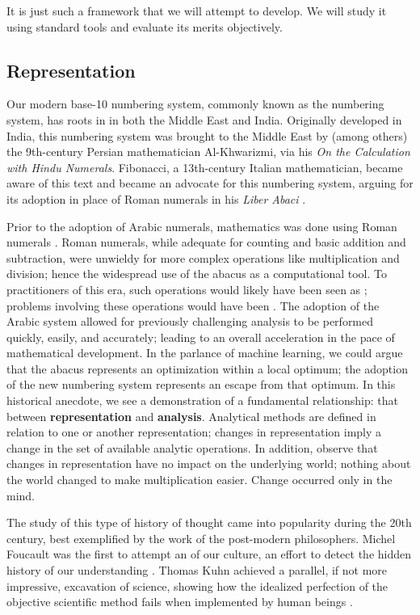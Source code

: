 It is just such a framework that we will attempt to develop.
We will study it using standard tools and evaluate its merits objectively.


\subsection{Representation}

Our modern base-10 numbering system, commonly known as the  numbering system, has roots in in both the Middle East and India.
Originally developed in India, this numbering system was brought to the Middle East by (among others) the 9th-century Persian mathematician Al-Khwarizmi, via his \textit{On the Calculation with Hindu Numerals}.
Fibonacci, a 13th-century Italian mathematician, became aware of this text and became an advocate for this numbering system, arguing for its adoption in place of Roman numerals in his \textit{Liber Abaci} \cite{ore} \cite{ferguson}.

Prior to the adoption of Arabic numerals, mathematics was done using Roman numerals \cite{heilbroner} \cite{gowers}.
Roman numerals, while adequate for counting and basic addition and subtraction, were unwieldy for more complex operations like multiplication and division; hence the widespread use of the abacus as a computational tool.
To practitioners of this era, such operations would likely have been seen as ; problems involving these operations would have been .
The adoption of the Arabic system allowed for previously challenging analysis to be performed quickly, easily, and accurately; leading to an overall acceleration in the pace of mathematical development.
In the parlance of machine learning, we could argue that the abacus represents an optimization within a local optimum; the adoption of the new numbering system represents an escape from that optimum.
In this historical anecdote, we see a demonstration of a fundamental relationship: that between \textbf{representation} and \textbf{analysis}.
Analytical methods are defined in relation to one or another representation; changes in representation imply a change in the set of available analytic operations.
In addition, observe that changes in representation have no impact on the underlying world; nothing about the world changed to make multiplication easier.
Change occurred only in the mind.

The study of this type of history of thought came into popularity during the 20th century, best exemplified by the work of the post-modern philosophers.
Michel Foucault was the first to attempt an  of our culture, an effort to detect the hidden history of our understanding \cite{foucault}.
Thomas Kuhn achieved a parallel, if not more impressive, excavation of science, showing how the idealized perfection of the objective scientific method fails when implemented by human beings \cite{kuhn}.

